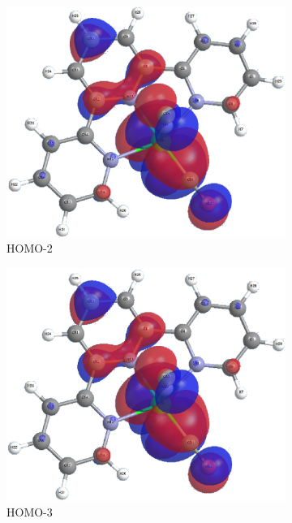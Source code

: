 \begin{figure}[!ht]
\begin{subfigure}[b]{0.31\textwidth}
  \includegraphics[clip=true, width=\textwidth, keepaspectratio]{images/mos/6h-2.eps}
  \caption{HOMO-2}
 \end{subfigure}
 \begin{subfigure}[b]{0.31\textwidth}
  \includegraphics[clip=true, width=\textwidth, keepaspectratio]{images/mos/6h-3.eps}
  \caption{HOMO-3}
 \end{subfigure}
 \begin{subfigure}[b]{0.31\textwidth}

\end{subfigure}
\end{figure}
